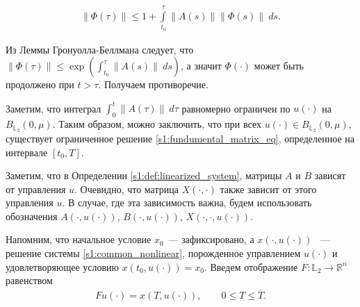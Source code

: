 \documentclass[../main.tex]{subfiles}
\begin{document}
\begin{gather*}
 \| \Phi(\tau) \| \leqslant 1 + \int\limits_{t_0}^{\tau} \| A(s)\| \|\Phi(s)\| \ ds.
\end{gather*}

Из Леммы Гронуолла-Беллмана следует, что $ \| \Phi(\tau) \| \leqslant \exp \left( \int_{t_0}^{\tau} \| A(s)\| \ ds \right)$, а значит $\Phi(\cdot)$ может быть продолжено при $t > \tau$. 
Получаем противоречие.

Заметим, что интеграл $\int_0^t \| A(\tau)\| \ d\tau$ равномерно ограничен по $u(\cdot) $ на $ B_{\mathbb{L}_2}(0,\mu)$.
Таким образом, можно заключить, что при всех $u(\cdot) \in B_{\mathbb{L}_2}(0,\mu)$, существует ограниченное решение \eqref{s1:fundumental_matrix_eq}, определенное на интервале $[t_0, T]$.

Заметим, что в Определении \ref{s1:def:linearized_system}, матрицы $A$ и $B$ зависят от управления $u$. 
Очевидно, что матрица $X(\cdot, \cdot)$ также зависит от этого управления $u$.
В случае, где эта зависимость важна, будем использовать обозначения $A(\cdot, u(\cdot))$, $B(\cdot, u(\cdot))$, $X(\cdot, \cdot, u(\cdot))$. 
 
 
Напомним, что начальное условие $x_0 $~--- зафиксировано, а $ x(\cdot,u(\cdot))$ ~--- решение системы \eqref{s1:common_nonlinear}, порожденное управлением $u(\cdot)$ и удовлетворяющее условию $x(t_0, u(\cdot)) = x_0$. 
Введем отображение $F: \mathbb{L}_2 \rightarrow \mathbb{R}^n $ равенством 
\begin{gather}\label{s1:solution_endpoint_mapping}
 Fu(\cdot) = x(T,u(\cdot)), \qquad 0 \leqslant T \leqslant \overline{T}.
\end{gather} 
 
\end{document}
